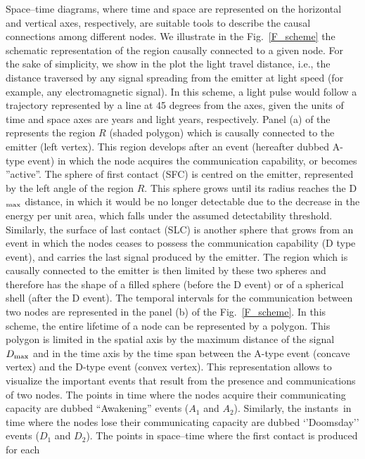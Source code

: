\documentclass[crop]{CSLB}
\newcommand{\ceti}{node}
\newcommand{\cetis}{nodes}
\newcommand{\ffn}[1]{}
\begin{document}
\ffn{1} Space--time diagrams, where time and space are represented on
the horizontal and vertical axes, respectively, are suitable tools to
describe the causal connections among different nodes.
%
We illustrate in the Fig.~\ref{F_scheme} the schematic representation
of the region causally connected to a given \ceti{}.
%
For the sake of simplicity, we show in the plot the light travel
distance, i.e., the distance traversed by any signal spreading from
the emitter at light speed (for example, any electromagnetic signal).
%
In this scheme, a light pulse would follow a trajectory represented by
a line at 45 degrees from the axes, given the units of time and
space axes are years and light years, respectively.
%
Panel (a) of the represents the region $R$ (shaded polygon)
which is causally connected to the emitter (left vertex).
%
This region develops after an event (hereafter dubbed A-type event) in
which the node acquires the communication capability, or becomes
''active''.
%
The sphere of first contact (SFC) is centred on the emitter,
represented by the left angle of the region $R$.
%
This sphere grows until its radius reaches the D$_{\rm max}$ distance, in
which it would be no longer detectable due to the decrease in the
energy per unit area, which falls under the assumed detectability
threshold.
%
Similarly, the surface of last contact (SLC) is another sphere that
grows from an event in which the nodes ceases to possess the
communication capability (D type event), and carries the last signal
produced by the emitter.
%
The region which is causally connected to the emitter is then limited
by these two spheres and therefore has the shape of a filled sphere
(before the D event) or of a spherical shell (after the D event).
%
The temporal intervals for the communication between two \cetis{} are
represented in the panel (b) of the Fig.~\ref{F_scheme}.
%
In this scheme, the entire lifetime of a \ceti{} can be represented by
a polygon.
%
This polygon is limited in the spatial axis by the maximum distance of
the signal $D_{\rm max}$ and in the time axis by the time span between the
A-type event (concave vertex) and the D-type event (convex vertex).
%
This representation allows to visualize the important events that
result from the presence and communications of two \cetis{}.
%
The points in time where the \cetis{} acquire their communicating
capacity are dubbed ``Awakening'' events ($A_1$ and $A_2$).
%
Similarly, the instants in time where the \cetis{} lose their
communicating capacity are dubbed ‘’Doomsday’’ events ($D_1$ and $D_2$).
%
The points in space--time where the first contact is produced for each
\end{document}
